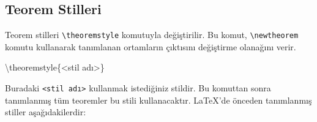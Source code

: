 \documentclass[
  letterpaper,
  DIV=11,
  numbers=noendperiod]{scrreprt}
\newenvironment{Shaded}{\begin{snugshade}}{\end{snugshade}}
\newcommand{\ExtensionTok}[1]{\textcolor[rgb]{0.00,0.23,0.31}{#1}}
\newcommand{\FunctionTok}[1]{\textcolor[rgb]{0.28,0.35,0.67}{#1}}
\newcommand{\KeywordTok}[1]{\textcolor[rgb]{0.00,0.23,0.31}{#1}}
\newcommand{\NormalTok}[1]{\textcolor[rgb]{0.00,0.23,0.31}{#1}}
\newcommand{\SpecialCharTok}[1]{\textcolor[rgb]{0.37,0.37,0.37}{#1}}
\newcommand{\SpecialStringTok}[1]{\textcolor[rgb]{0.13,0.47,0.30}{#1}}
\begin{document}
\begin{Shaded}
\end{Shaded}

\hypertarget{teorem-stilleri}{%
\subsection{Teorem Stilleri}\label{teorem-stilleri}}

Teorem stilleri \texttt{\textbackslash{}theoremstyle} komutuyla
değiştirilir. Bu komut, \texttt{\textbackslash{}newtheorem} komutu
kullanarak tanımlanan ortamların çıktısını değiştirme olanağını verir.

\begin{Shaded}
\begin{Highlighting}[]
\FunctionTok{\textbackslash{}theoremstyle}\NormalTok{\{\textless{}stil adı\textgreater{}\}}
\end{Highlighting}
\end{Shaded}

Buradaki \texttt{\textless{}stil\ adı\textgreater{}} kullanmak
istediğiniz stildir. Bu komuttan sonra tanımlanmış tüm teoremler bu
stili kullanacaktır. {\LaTeX}'de önceden tanımlanmış stiller
aşağıdakilerdir:
\end{document}
